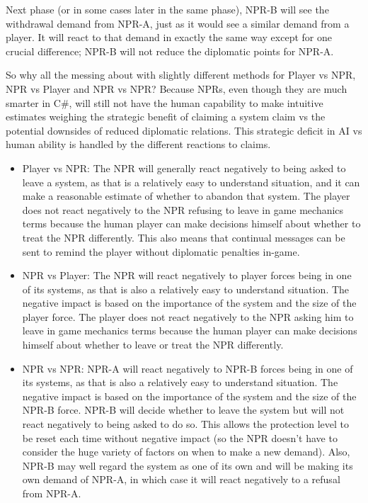 \documentclass[../Aurora C# unofficial manual.tex]{subfiles}
\begin{document}
	Next phase (or in some cases later in the same phase), NPR-B will see the withdrawal demand from NPR-A, just as it would see a similar demand from a player. It will react to that demand in exactly the same way except for one crucial difference; NPR-B will not reduce the diplomatic points for NPR-A.
	
	So why all the messing about with slightly different methods for Player vs NPR, NPR vs Player and NPR vs NPR? Because NPRs, even though they are much smarter in C\#, will still not have the human capability to make intuitive estimates weighing the strategic benefit of claiming a system claim vs the potential downsides of reduced diplomatic relations. This strategic deficit in AI vs human ability is handled by the different reactions to claims.
	\begin{itemize}
		\item Player vs NPR: The NPR will generally react negatively to being asked to leave a system, as that is a relatively easy to understand situation, and it can make a reasonable estimate of whether to abandon that system. The player does not react negatively to the NPR refusing to leave in game mechanics terms because the human player can make decisions himself about whether to treat the NPR differently. This also means that continual messages can be sent to remind the player without diplomatic penalties in-game.
		\item NPR vs Player: The NPR will react negatively to player forces being in one of its systems, as that is also a relatively easy to understand situation. The negative impact is based on the importance of the system and the size of the player force. The player does not react negatively to the NPR asking him to leave in game mechanics terms because the human player can make decisions himself about whether to leave or treat the NPR differently.
		\item NPR vs NPR: NPR-A will react negatively to NPR-B forces being in one of its systems, as that is also a relatively easy to understand situation. The negative impact is based on the importance of the system and the size of the NPR-B force. NPR-B will decide whether to leave the system but will not react negatively to being asked to do so. This allows the protection level to be reset each time without negative impact (so the NPR doesn't have to consider the huge variety of factors on when to make a new demand). Also, NPR-B may well regard the system as one of its own and will be making its own demand of NPR-A, in which case it will react negatively to a refusal from NPR-A.
	\end{itemize}
	
\end{document}
